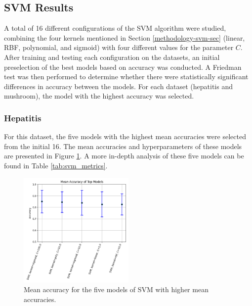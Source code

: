 \subsection{SVM Results} A total of 16 different configurations of the SVM algorithm were studied, combining the four kernels mentioned in Section \ref{methodology-svm-sec} (linear, RBF, polynomial, and sigmoid) with four different values for the parameter $C$. After training and testing each configuration on the datasets, an initial preselection of the best models based on accuracy was conducted. A Friedman test was then performed to determine whether there were statistically significant differences in accuracy between the models. For each dataset (hepatitis and mushroom), the model with the highest accuracy was selected.

\subsubsection{Hepatitis} For this dataset, the five models with the highest mean accuracies were selected from the initial 16. The mean accuracies and hyperparameters of these models are presented in Figure \ref{fig:hep-svm-1}. A more in-depth analysis of these five models can be found in Table \ref{tab:svm_metrics}.

\begin{figure}[h!]
    \centering
    \includegraphics[width=0.5\textwidth]{figures/svm/hepatitis/statistical_analysis_results.png}
    \caption{Mean accuracy for the five models of SVM with higher mean accuracies.}
    \label{fig:hep-svm-1}
\end{figure}


